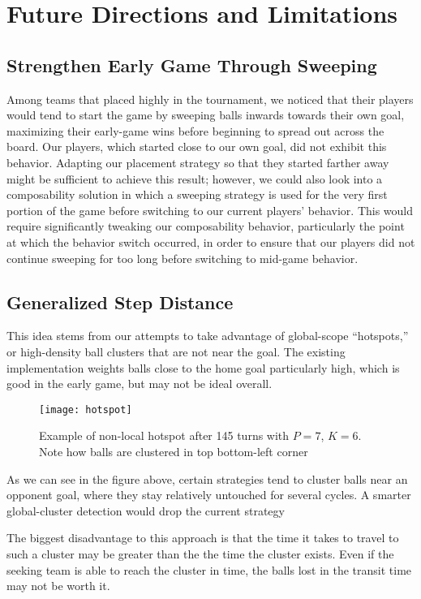 \documentclass[
10pt, %
letterpaper, %
oneside, %
headinclude,footinclude, %
english
]{article}
\begin{document}
\section{Future Directions and Limitations}

\subsection{Strengthen Early Game Through Sweeping}
Among teams that placed highly in the tournament, we noticed that their players would tend to start the game by sweeping balls inwards towards their own goal, maximizing their early-game wins before beginning to spread out across the board. Our players, which started close to our own goal, did not exhibit this behavior. Adapting our placement strategy so that they started farther away might be sufficient to achieve this result; however, we could also look into a composability solution in which a sweeping strategy is used for the very first portion of the game before switching to our current players' behavior. This would require significantly tweaking our composability behavior, particularly the point at which the behavior switch occurred, in order to ensure that our players did not continue sweeping for too long before switching to mid-game behavior.

\subsection{Generalized Step Distance}
This idea stems from our attempts to take advantage of global-scope “hotspots,” or high-density ball clusters that are not near the goal. The existing implementation weights balls close to the home goal particularly high, which is good in the early game, but may not be ideal overall.

\begin{figure}[h]
\centering
\texttt{[image: hotspot]}
\caption[Example of non-local hotspot]{Example of non-local hotspot after 145 turns with $P=7$, $K=6$. Note how balls are clustered in top bottom-left corner}
\label{fig:gallery2}
\end{figure}

As we can see in the figure above, certain strategies tend to cluster balls near an opponent goal, where they stay relatively untouched for several cycles. A smarter global-cluster detection would drop the current strategy

The biggest disadvantage to this approach is that the time it takes to travel to such a cluster may be greater than the the time the cluster exists. Even if the seeking team is able to reach the cluster in time, the balls lost in the transit time may not be worth it.
\end{document}
